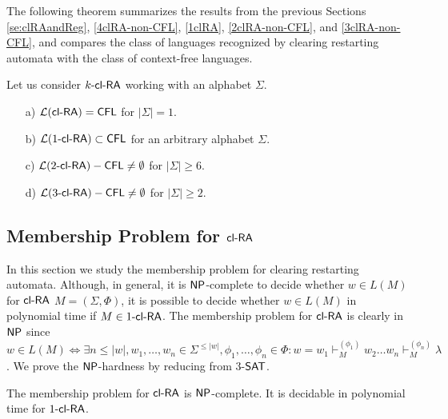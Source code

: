 The following theorem summarizes the results from the previous Sections
\ref{se:clRAandReg}, \ref{4clRA-non-CFL}, \ref{1clRA}, \ref{2clRA-non-CFL}, and \ref{3clRA-non-CFL},
and compares the class of languages recognized by clearing restarting automata
with the class of context-free languages.

\begin{theorem} Let us consider $\kclRA$ working with an alphabet $\Sigma$.
\begin{enumerate}
    \item[a)]
        $\calL{\clRA} = \CFL$ for $|\Sigma| = 1$.
    \item[b)]
        $\calL{\kclRA[1]} \subset \CFL$ for an arbitrary alphabet $\Sigma$.
    \item[c)]
        $\calL{\kclRA[2]} - \CFL \not= \emptyset$ for $|\Sigma| \ge 6$.
    \item[d)]
        $\calL{\kclRA[3]} - \CFL \not= \emptyset$ for $|\Sigma| \ge 2$.
\end{enumerate}
\end{theorem}

\subsection{Membership Problem for $\clRA$}\label{clra_membership}

In this section we study the membership problem for clearing restarting automata. Although, in general, it is $\NP$-complete to decide whether $w \in L(M)$ for $\clRA$ $M = (\Sigma, \Phi)$, it is possible to decide whether $w \in L(M)$ in polynomial time if $M \in \kclRA[1]$. The membership problem for $\clRA$ is clearly in $\NP$ since $w \in L(M) \Leftrightarrow \exists n \le |w|, w_1, \ldots, w_n \in \Sigma^{\le |w|}, \phi_1, \ldots, \phi_n \in \Phi: w = w_1 \vdash_M^{(\phi_1)} w_2 \ldots w_n \vdash_M^{(\phi_n)} \lambda$. We prove the $\NP$-hardness by reducing from $3$-$\SAT$.

\begin{theorem}\label{theorem:clra_membership}
The membership problem for $\clRA$ is $\NP$-complete. It is decidable in polynomial time for $\kclRA[1]$.
\end{theorem}

